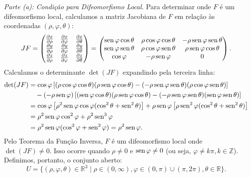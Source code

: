 {	\textit{Parte (a): Condição para Difeomorfismo Local.}
	Para determinar onde $F$ é um difeomorfismo local, calculamos a matriz Jacobiana de $F$ em relação às coordenadas $(\rho, \varphi, \theta)$:
	\begin{equation*}
		JF = \begin{pmatrix} 
			\tfrac{\partial x}{\partial \rho} & \tfrac{\partial x}{\partial \varphi} & \tfrac{\partial x}{\partial \theta} \\ 
			\tfrac{\partial y}{\partial \rho} & \tfrac{\partial y}{\partial \varphi} & \tfrac{\partial y}{\partial \theta} \\ 
			\tfrac{\partial z}{\partial \rho} & \tfrac{\partial z}{\partial \varphi} & \tfrac{\partial z}{\partial \theta} 
		\end{pmatrix} = 
		\begin{pmatrix} 
			\operatorname{sen} \varphi \cos \theta & \rho \cos \varphi \cos \theta & -\rho \operatorname{sen} \varphi \operatorname{sen} \theta \\ 
			\operatorname{sen} \varphi \operatorname{sen} \theta & \rho \cos \varphi \operatorname{sen} \theta & \rho \operatorname{sen} \varphi \cos \theta \\ 
			\cos \varphi & -\rho \operatorname{sen} \varphi & 0 
		\end{pmatrix}.
	\end{equation*}
	Calculamos o determinante $\det(JF)$ expandindo pela terceira linha:
	\begin{align*}
		\det(JF) &= \cos \varphi \left[ (\rho \cos \varphi \cos \theta)(\rho \operatorname{sen} \varphi \cos \theta) - (-\rho \operatorname{sen} \varphi \operatorname{sen} \theta)(\rho \cos \varphi \operatorname{sen} \theta) \right] \\
		&\quad - (-\rho \operatorname{sen} \varphi) \left[ (\operatorname{sen} \varphi \cos \theta)(\rho \operatorname{sen} \varphi \cos \theta) - (-\rho \operatorname{sen} \varphi \operatorname{sen} \theta)(\operatorname{sen} \varphi \operatorname{sen} \theta) \right] \\
		&= \cos \varphi \left[ \rho^2 \operatorname{sen} \varphi \cos \varphi (\cos^2 \theta + \operatorname{sen}^2 \theta) \right] + \rho \operatorname{sen} \varphi \left[ \rho \operatorname{sen}^2 \varphi (\cos^2 \theta + \operatorname{sen}^2 \theta) \right] \\
		&= \rho^2 \operatorname{sen} \varphi \cos^2 \varphi + \rho^2 \operatorname{sen}^3 \varphi \\
		&= \rho^2 \operatorname{sen} \varphi (\cos^2 \varphi + \operatorname{sen}^2 \varphi) = \rho^2 \operatorname{sen} \varphi.
	\end{align*}
	Pelo Teorema da Função Inversa, $F$ é um difeomorfismo local onde $\det(JF) \neq 0$. Isso ocorre quando $\rho \neq 0$ e $\operatorname{sen} \varphi \neq 0$ (ou seja, $\varphi \neq k\pi, k \in \mathbb{Z}$). Definimos, portanto, o conjunto aberto:
	\begin{equation*}
		U = \{ (\rho, \varphi, \theta) \in \mathbb{R}^3 \mid \rho \in (0, \infty), \varphi \in (0, \pi) \cup (\pi, 2\pi), \theta \in \mathbb{R} \}.
	\end{equation*}
	
}
